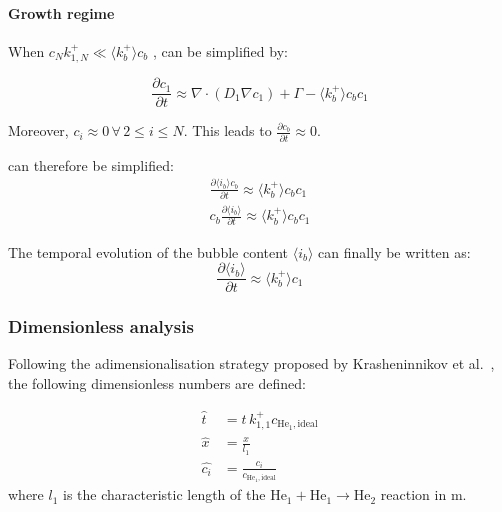 \paragraph{Growth regime}
When $c_N k_{1,N}^+ \ll \langle k_b^+ \rangle c_b$ ,  can be simplified by:

\begin{equation}
    \frac{\partial c_1}{\partial t} \approx \nabla \cdot (D_1 \nabla c_1) + \Gamma - \langle k_b^+ \rangle c_b c_1
\end{equation}

Moreover, $c_i \approx 0 \, \forall \, 2 \leq i \leq N$.
This leads to $\frac{\partial c_b}{\partial t} \approx 0$.

 can therefore be simplified:
\begin{subequations}
    \begin{align}
        \frac{\partial \langle i_b \rangle c_b}{\partial t} \approx \langle k_b^+ \rangle c_b c_1 \\
        c_b \frac{\partial \langle i_b \rangle}{\partial t} \approx \langle k_b^+ \rangle c_b c_1
    \end{align}
\end{subequations}

The temporal evolution of the bubble content $\langle i_b \rangle$ can finally be written as:
\begin{equation}
    \frac{\partial \langle i_b \rangle}{\partial t} \approx \langle k_b^+ \rangle c_1
\end{equation}

\subsubsection{Dimensionless analysis}

Following the adimensionalisation strategy proposed by Krasheninnikov et al.\ , the following dimensionless numbers are defined:

\begin{align}
    \hat{t} &= t \, k^+_{1,1} c_{\mathrm{He}_1, \mathrm{ideal}} \\
    \hat{x} &= \frac{x}{l_1} \\
    \hat{c_i} &= \frac{c_i}{c_{\mathrm{He}_1, \mathrm{ideal}}}
\end{align}
where $l_1$ is the characteristic length of the $\mathrm{He}_1 + \mathrm{He}_1 \rightarrow \mathrm{He}_2$ reaction in \si{m}.

